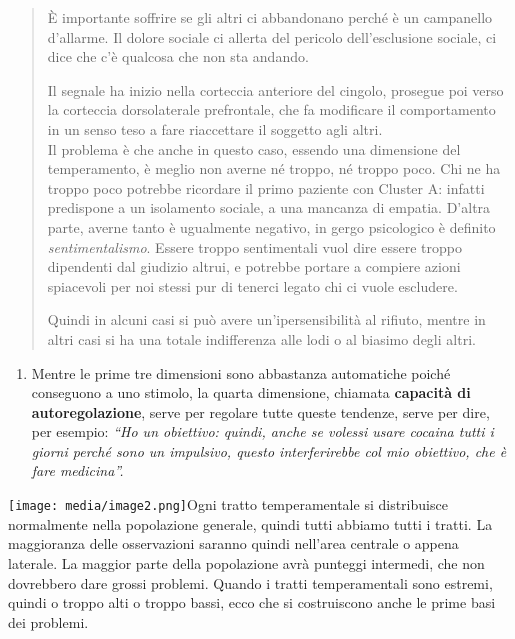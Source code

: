 \documentclass[]{article}
\begin{document}
\begin{quote}
È importante soffrire se gli altri ci abbandonano perché è un campanello
d'allarme. Il dolore sociale ci allerta del pericolo dell'esclusione
sociale, ci dice che c'è qualcosa che non sta andando.

Il segnale ha inizio nella corteccia anteriore del cingolo, prosegue poi
verso la corteccia dorsolaterale prefrontale, che fa modificare il
comportamento in un senso teso a fare riaccettare il soggetto agli
altri.\\
Il problema è che anche in questo caso, essendo una dimensione del
temperamento, è meglio non averne né troppo, né troppo poco. Chi ne ha
troppo poco potrebbe ricordare il primo paziente con Cluster A: infatti
predispone a un isolamento sociale, a una mancanza di empatia. D'altra
parte, averne tanto è ugualmente negativo, in gergo psicologico è
definito \emph{sentimentalismo}. Essere troppo sentimentali vuol dire
essere troppo dipendenti dal giudizio altrui, e potrebbe portare a
compiere azioni spiacevoli per noi stessi pur di tenerci legato chi ci
vuole escludere.

Quindi in alcuni casi si può avere un'ipersensibilità al rifiuto, mentre
in altri casi si ha una totale indifferenza alle lodi o al biasimo degli
altri.
\end{quote}

\begin{enumerate}
\def\labelenumi{\arabic{enumi}.}
\item
  Mentre le prime tre dimensioni sono abbastanza automatiche poiché
  conseguono a uno stimolo, la quarta dimensione, chiamata
  \textbf{capacità di autoregolazione}, serve per regolare tutte queste
  tendenze, serve per dire, per esempio: \emph{``Ho un obiettivo:
  quindi, anche se volessi usare cocaina tutti i giorni perché sono un
  impulsivo, questo interferirebbe col mio obiettivo, che è fare
  medicina''.}
\end{enumerate}

\texttt{[image: media/image2.png]}Ogni
tratto temperamentale si distribuisce normalmente nella popolazione
generale, quindi tutti abbiamo tutti i tratti. La maggioranza delle
osservazioni saranno quindi nell'area centrale o appena laterale. La
maggior parte della popolazione avrà punteggi intermedi, che non
dovrebbero dare grossi problemi. Quando i tratti temperamentali sono
estremi, quindi o troppo alti o troppo bassi, ecco che si costruiscono
anche le prime basi dei problemi.
\end{document}
